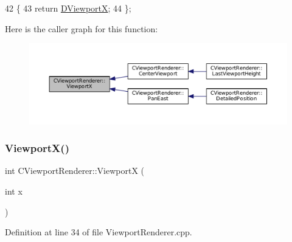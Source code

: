 \begin{DoxyCode}
42                              \{
43             \textcolor{keywordflow}{return} \hyperlink{classCViewportRenderer_aea9e05347f71a8e6b83439aab653be18}{DViewportX};  
44         \};
\end{DoxyCode}
Here is the caller graph for this function\+:\nopagebreak
\begin{figure}[H]
\begin{center}
\leavevmode
\includegraphics[width=350pt]{classCViewportRenderer_adf6c09ee00cdbf0803e72d59bff9a235_icgraph}
\end{center}
\end{figure}
\hypertarget{classCViewportRenderer_ac81f563649d991e03cc0f35a86dda296}{}\label{classCViewportRenderer_ac81f563649d991e03cc0f35a86dda296} 
\subsubsection{\texorpdfstring{Viewport\+X()}{ViewportX()}\hspace{0.1cm}{\footnotesize\ttfamily [2/2]}}
{\footnotesize\ttfamily int C\+Viewport\+Renderer\+::\+ViewportX (\begin{DoxyParamCaption}\item[{int}]{x }\end{DoxyParamCaption})}



Definition at line 34 of file Viewport\+Renderer.\+cpp.


